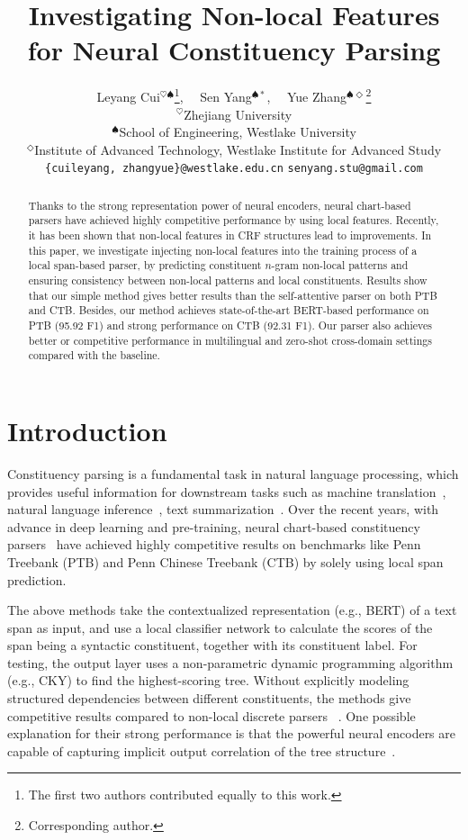\documentclass[11pt]{article}
\title{Investigating Non-local Features for Neural Constituency Parsing}
\author{
  Leyang Cui$^{\heartsuit \spadesuit}$\thanks{\quad The first two authors contributed equally to this work.}, \ \ Sen Yang$^{\spadesuit *}$, \ \ Yue Zhang$^{\spadesuit \Diamond}$\thanks{\quad Corresponding author.} \\
$^\heartsuit$Zhejiang University \\
  $^\spadesuit$School of Engineering, Westlake University \\
  $^\Diamond$Institute of Advanced Technology, Westlake Institute for Advanced Study \\
 \texttt{\{cuileyang, zhangyue\}@westlake.edu.cn} \hspace{5pt} \texttt{senyang.stu@gmail.com}
  
  }
\begin{document}
\maketitle
\begin{abstract}

Thanks to the strong representation power of neural encoders, neural chart-based parsers have achieved highly competitive performance by using local features. 
Recently, it has been shown that non-local features in CRF structures lead to improvements. 
In this paper, we investigate injecting non-local features into the training process of a local span-based parser, by predicting constituent $n$-gram non-local patterns and ensuring consistency between non-local patterns and local constituents. 
Results show that our simple method gives better results than the self-attentive parser on both PTB and CTB. 
Besides, our method achieves state-of-the-art BERT-based performance on PTB (95.92 F1) and strong performance on CTB (92.31 F1). 
Our parser also achieves better or competitive performance in multilingual and zero-shot cross-domain settings compared with the baseline.

\end{abstract}

\section{Introduction}

Constituency parsing is a fundamental task in natural language processing, which provides useful information for downstream tasks such as machine translation~\cite{tree-mt}, natural language inference~\cite{nli}, text summarization~\cite{cp-summarization}. Over the recent years, with advance in deep learning and pre-training, neural chart-based constituency parsers~\cite{minimal-span,san-constituency} have achieved highly competitive results on benchmarks like Penn Treebank (PTB) and Penn Chinese Treebank (CTB) by solely using local span prediction.



The above methods take the contextualized representation (e.g., BERT) of a text span as input, and use a local classifier network to calculate the scores of the span being a syntactic constituent, together with its constituent label. For testing, the output layer uses a non-parametric dynamic programming algorithm (e.g., CKY) to find the highest-scoring tree. Without explicitly modeling structured dependencies between different constituents, the methods give competitive results compared to non-local discrete parsers ~\cite{minimal-span,san-constituency}.
One possible explanation for their strong performance is that the powerful neural encoders are capable of capturing implicit output correlation of the tree structure~\cite{minimal-span, going-on-parser, two-local-model}.
\end{document}
